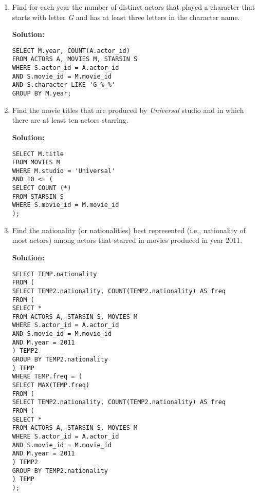 \begin{enumerate}
\item Find for each year the number of distinct actors that played a character that starts with letter \textit{G} and has at least three letters in the character name.

\textbf{Solution:}

\begin{verbatim}
SELECT M.year, COUNT(A.actor_id)
FROM ACTORS A, MOVIES M, STARSIN S
WHERE S.actor_id = A.actor_id
AND S.movie_id = M.movie_id
AND S.character LIKE 'G_%_%'
GROUP BY M.year;
\end{verbatim}

\item Find the movie titles that are produced by \textit{Universal} studio and in which there are at least ten actors starring.

\textbf{Solution:}

\begin{verbatim}
SELECT M.title
FROM MOVIES M
WHERE M.studio = 'Universal'
AND 10 <= (
SELECT COUNT (*)
FROM STARSIN S
WHERE S.movie_id = M.movie_id
);
\end{verbatim}

\item Find the nationality (or nationalities) best represented (i.e., nationality of most actors) among actors that starred in movies produced in year 2011.

\textbf{Solution:}

\begin{verbatim}
SELECT TEMP.nationality
FROM (
SELECT TEMP2.nationality, COUNT(TEMP2.nationality) AS freq
FROM (
SELECT *
FROM ACTORS A, STARSIN S, MOVIES M
WHERE S.actor_id = A.actor_id
AND S.movie_id = M.movie_id
AND M.year = 2011
) TEMP2
GROUP BY TEMP2.nationality
) TEMP
WHERE TEMP.freq = (
SELECT MAX(TEMP.freq)
FROM (
SELECT TEMP2.nationality, COUNT(TEMP2.nationality) AS freq
FROM (
SELECT *
FROM ACTORS A, STARSIN S, MOVIES M
WHERE S.actor_id = A.actor_id
AND S.movie_id = M.movie_id
AND M.year = 2011
) TEMP2
GROUP BY TEMP2.nationality
) TEMP
);
\end{verbatim}

\end{enumerate}
